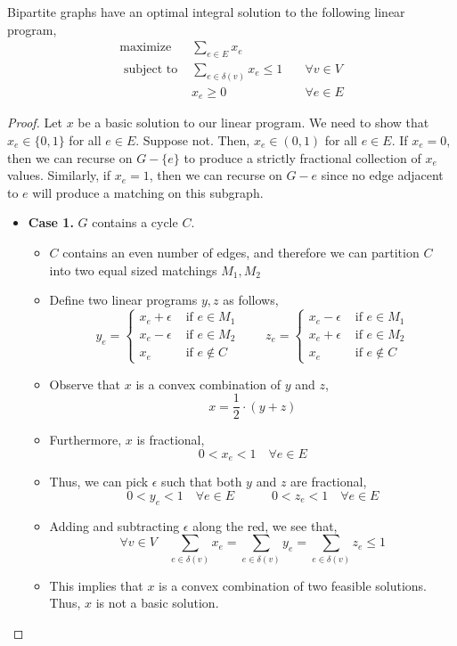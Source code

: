 	\begin{thm}
		Bipartite graphs have an optimal integral solution to the following linear program,
		\[
			\begin{array}{lll}
				\operatorname{maximize} & \sum_{e \in E} x_{e} & \\
				\text{ subject to } & \sum_{e \in \delta(v)} x_{e} \leq 1 & \quad \forall v \in V \\
				& x_{e} \geq 0 & \quad \forall e \in E
			\end{array}
		\]
	\end{thm}

	\begin{proof}
		Let $x$ be a basic solution to our linear program. We need to show that $x_e \in \{0,1\}$ for all $e \in E$. Suppose not. Then, $x_e \in (0,1)$ for all $e \in E$. If $x_e = 0$, then we can recurse on $G - \{e\}$ to produce a strictly fractional collection of $x_e$ values. Similarly, if $x_e = 1$, then we can recurse on $G - e$ since no edge adjacent to $e$ will produce a matching on this subgraph.
		\begin{itemize}
			\item \textbf{Case 1.} $G$ contains a cycle $C$.
			\begin{itemize}
				\item $C$ contains an even number of edges, and therefore we can partition $C$ into two equal sized matchings $M_1, M_2$
				\item Define two linear programs $y, z$ as follows,
				\[
				y_{e}=\left\{\begin{array}{ll}x_{e}+\epsilon & \text { if } e \in M_{1} \\ x_{e}-\epsilon & \text { if } e \in M_{2} \\ x_{e} & \text { if } e \notin C\end{array} \quad \quad z_{e}= \begin{cases}x_{e}-\epsilon & \text { if } e \in M_{1} \\ x_{e}+\epsilon & \text { if } e \in M_{2} \\ x_{e} & \text { if } e \notin C\end{cases}\right.
				\]
				\item Observe that $x$ is a convex combination of $y$ and $z$,
				\[x = \frac{1}{2} \cdot (y + z)\]
				\item Furthermore, $x$ is fractional,
				\[0 < x_e < 1 \quad \forall e \in E\]
				\item Thus, we can pick $\epsilon$ such that both $y$ and $z$ are fractional,
				\[0<y_{e}<1 \quad \forall e \in E \quad \quad \quad 0<z_{e}<1 \quad \forall e \in E\]
				\item Adding and subtracting $\epsilon$ along the red, we see that,
				\[\forall v \in V \quad \sum_{e \in \delta(v)} x_{e}=\sum_{e \in \delta(v)} y_{e}=\sum_{e \in \delta(v)} z_{e} \leq 1\]
				\item This implies that $x$ is a convex combination of two feasible solutions. Thus, $x$ is not a basic solution.
			\end{itemize}


\end{itemize}
\end{proof}
